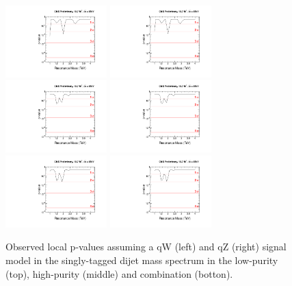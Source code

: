 \begin{figure}[h!tpb]
\begin{center}
\includegraphics[width=0.35\textwidth]{EXO-12-024/figs/limits/pvalue_qW_low_purity.pdf}
\includegraphics[width=0.35\textwidth]{EXO-12-024/figs/limits/pvalue_qZ_low_purity.pdf}\\
\includegraphics[width=0.35\textwidth]{EXO-12-024/figs/limits/pvalue_qW_high_purity.pdf}
\includegraphics[width=0.35\textwidth]{EXO-12-024/figs/limits/pvalue_qZ_high_purity.pdf}\\
\includegraphics[width=0.35\textwidth]{EXO-12-024/figs/limits/pvalue_qW_combined.pdf}
\includegraphics[width=0.35\textwidth]{EXO-12-024/figs/limits/pvalue_qZ_combined.pdf}
\end{center}
\caption{Observed local p-values assuming a qW (left) and qZ (right) signal model in the singly-tagged dijet mass spectrum in the low-purity (top), high-purity (middle) and combination (botton).}
\label{fig:Vtagresults4}
\end{figure}

